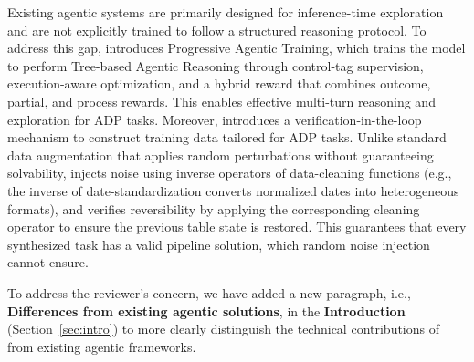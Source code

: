 Existing agentic systems are primarily designed for inference-time exploration and are not explicitly trained to follow a structured reasoning protocol. To address this gap, \sys introduces Progressive Agentic Training, which trains the model to perform Tree-based Agentic Reasoning through control-tag supervision, execution-aware optimization, and a hybrid reward that combines outcome, partial, and process rewards. This enables effective multi-turn reasoning and exploration for ADP tasks. Moreover, \sys introduces a verification-in-the-loop mechanism to construct training data tailored for ADP tasks. Unlike standard data augmentation that applies random perturbations without guaranteeing solvability, \sys injects noise using inverse operators of data-cleaning functions (e.g., the inverse of date-standardization converts normalized dates into heterogeneous formats), and verifies reversibility by applying the corresponding cleaning operator to ensure the previous table state is restored. This guarantees that every synthesized task has a valid pipeline solution, which random noise injection cannot ensure.


{
To address the reviewer's concern, we have added a new paragraph, i.e., \textbf{Differences from existing agentic solutions}, in the \textbf{Introduction} (Section~\ref{sec:intro}) to more clearly distinguish the technical contributions of \sys from existing agentic frameworks.
}


